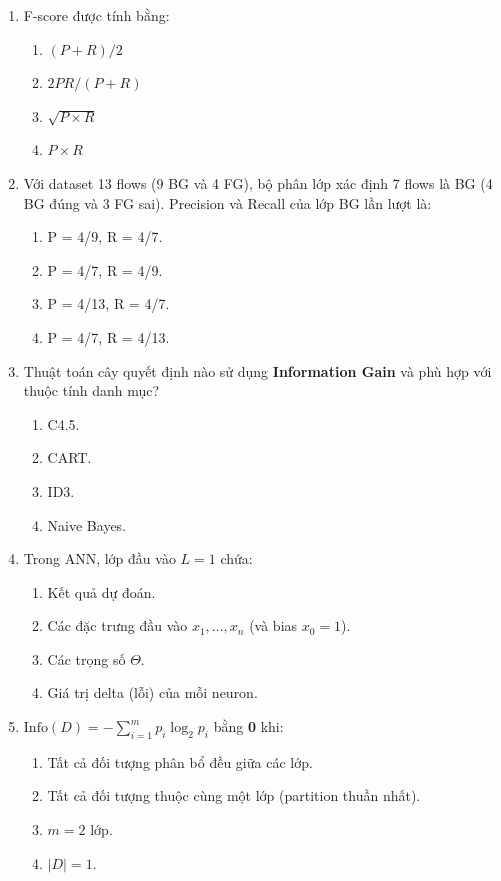 \documentclass[10pt]{article}
\begin{document}
\begin{enumerate}[leftmargin=*, label=\textbf{Câu \arabic*.}]
    \item F-score được tính bằng:
    \begin{enumerate}[label=\Alph*.]
        \item $(P + R) / 2$
        \item $2PR / (P + R)$
        \item $\sqrt{P \times R}$
        \item $P \times R$
    \end{enumerate}

    \item Với dataset 13 flows (9 BG và 4 FG), bộ phân lớp xác định 7 flows là BG (4 BG đúng và 3 FG sai). Precision và Recall của lớp BG lần lượt là:
    \begin{enumerate}[label=\Alph*.]
        \item P = 4/9, R = 4/7.
        \item P = 4/7, R = 4/9.
        \item P = 4/13, R = 4/7.
        \item P = 4/7, R = 4/13.
    \end{enumerate}

    \item Thuật toán cây quyết định nào sử dụng \textbf{Information Gain} và phù hợp với thuộc tính danh mục?
    \begin{enumerate}[label=\Alph*.]
        \item C4.5.
        \item CART.
        \item ID3.
        \item Naive Bayes.
    \end{enumerate}

    \item Trong ANN, lớp đầu vào $L=1$ chứa:
    \begin{enumerate}[label=\Alph*.]
        \item Kết quả dự đoán.
        \item Các đặc trưng đầu vào $x_1, \ldots, x_n$ (và bias $x_0 = 1$).
        \item Các trọng số $\Theta$.
        \item Giá trị delta (lỗi) của mỗi neuron.
    \end{enumerate}

    \item $\text{Info}(D) = -\sum_{i=1}^{m} p_i \log_2 p_i$ bằng \textbf{0} khi:
    \begin{enumerate}[label=\Alph*.]
        \item Tất cả đối tượng phân bổ đều giữa các lớp.
        \item Tất cả đối tượng thuộc cùng một lớp (partition thuần nhất).
        \item $m = 2$ lớp.
        \item $|D| = 1$.
    \end{enumerate}


\end{enumerate}
\end{document}
